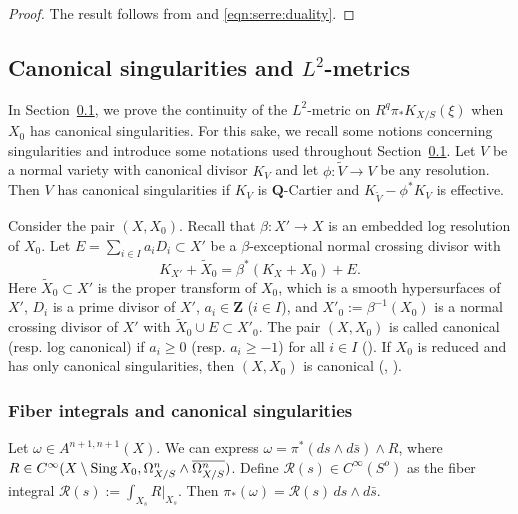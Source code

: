 \documentclass[amscd, leqno]{amsart}
\theoremstyle{plain}
\theoremstyle{definition}
\theoremstyle{remark}
\newenvironment{pf}{\begin{proof}}{\end{proof}}
\begin{document}
\begin{pf}
The result follows from \cite[Cor.\,3.2]{ErikssonFreixas26} and \eqref{eqn:serre:duality}.
\end{pf}




\subsection
{Canonical singularities and $L^{2}$-metrics}
\label{sect:5.3}
In Section~\ref{sect:5.3}, we prove the continuity of the $L^{2}$-metric on $R^{q}\pi_{*}K_{X/S}(\xi)$ when $X_{0}$ has canonical singularities. 
For this sake, we recall some notions concerning singularities and introduce some notations used throughout Section~\ref{sect:5.3}. 
Let $V$ be a normal variety with canonical divisor $K_{V}$ and let $\phi \colon \widetilde{V} \to V$ be any resolution. 
Then $V$ has canonical singularities if $K_{V}$ is ${\mathbf Q}$-Cartier and $K_{\widetilde{V}} - \phi^{*}K_{V}$ is effective. 
\par
Consider the pair $(X, X_{0})$. Recall that $\beta \colon X' \to X$ is an embedded log resolution of $X_{0}$. 
Let $E = \sum_{i\in I} a_{i} D_{i} \subset X'$ be a $\beta$-exceptional normal crossing divisor with
\begin{equation}
\label{eqn:discrepancy}
K_{X'}+\widetilde{X}_{0} = \beta^{*}( K_{X} + X_{0} ) + E.
\end{equation}
Here $\widetilde{X}_{0}\subset X'$ is the proper transform of $X_{0}$, which is a smooth hypersurfaces of $X'$, 
$D_{i}$ is a prime divisor of $X'$, $a_{i}\in {\mathbf Z}$ ($i\in I$), 
and $X'_{0} := \beta^{-1}(X_{0})$ is a normal crossing divisor of $X'$ with $\widetilde{X}_{0}\cup E\subset X'_{0}$.
The pair $(X, X_{0})$ is called canonical (resp. log canonical) if $a_{i} \geq 0$ (resp. $a_{i}\geq -1$) for all $i \in I$ (\cite[Def.\,3.5]{Kollar97}). 
If $X_{0}$ is reduced and has only canonical singularities, then $(X, X_{0})$ is canonical (\cite{Stevens88}, \cite[Th.\,7.9]{Kollar97}).



\subsubsection
{Fiber integrals and canonical singularities}
\label{sect:5.3.1}
\par
Let $\omega \in A^{n+1,n+1}(X)$. We can express $\omega = \pi^{*}(ds\wedge d\bar{s})\wedge R$, where
$R\in C^{\infty}(X\setminus{\rm Sing}\,X_{0},\Omega_{X/S}^{n}\wedge\overline{\Omega_{X/S}^{n}})$.
Define ${\mathcal R}(s)\in C^{\infty}(S^{o})$ as the fiber integral $\displaystyle {\mathcal R}(s):=\int_{X_{s}}R|_{X_{s}}$. 
Then $\pi_{*}(\omega) = {\mathcal R}(s)\,ds\wedge d\bar{s}$.
\end{document}
